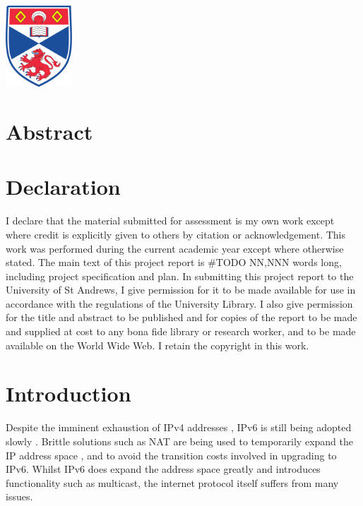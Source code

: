 \documentclass[12pt]{article}
\begin{document}
\begin{titlepage}
\includegraphics[width = 2.5cm]{images/standrewslogo.png}
 

\vfill %

\end{titlepage}


\section*{Abstract}



\section*{Declaration}
I declare that the material submitted for
assessment is my own work except where credit is
explicitly given to others by citation or
acknowledgement. This work was performed during
the current academic year except where otherwise
stated.
The main text of this project report is \#TODO NN,NNN
words long, including project specification and plan.
In submitting this project report to the University of
St Andrews, I give permission for it to be made
available for use in accordance with the regulations of
the University Library. I also give permission for
the title and abstract to be published and for copies of
the report to be made and supplied at cost to any bona
fide library or research worker, and to be made
available on the World Wide Web. I retain the
copyright in this work.

\newpage

\tableofcontents

\newpage
{}
\setcounter{page}{1} 

\section{Introduction}

Despite the imminent exhaustion of IPv4 addresses \cite{ripe_labs}, IPv6 is still being adopted slowly \cite{google_ipv6}. Brittle solutions such as NAT are being used to temporarily expand the IP address space , and to avoid the transition costs involved in upgrading to IPv6. Whilst IPv6 does expand the address space greatly and introduces functionality such as multicast, the internet protocol itself suffers from many issues. 
\end{document}
